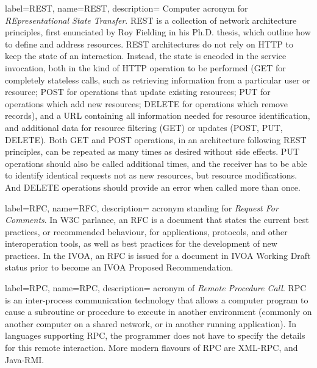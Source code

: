{
    label={REST},
    name={REST},
    description={
    	Computer acronym for \emph{REpresentational State Transfer}.
        REST is a collection of network architecture principles, first
        enunciated by Roy Fielding in his Ph.D. thesis, which outline
        how to define and address resources. REST architectures do not
        rely on \gls{HTTP} to keep the state of an interaction.
        Instead, the state is encoded in the service invocation, both
        in the kind of HTTP operation to be performed (GET for
        completely stateless calls, such as retrieving information from
        a particular user or resource; POST for operations that update
        existing resources; PUT for operations which add new resources;
        DELETE for operations which remove records), and a URL
        containing all information needed for resource identification,
        and additional data for resource filtering (GET) or updates
        (POST, PUT, DELETE). Both GET and POST operations, in an
        architecture following REST principles, can be repeated as many
        times as desired without side effects. PUT operations should
        also be called additional times, and the receiver has to be
        able to identify identical requests not as new resources, but
        resource modifications. And DELETE operations should provide an
        error when called more than once.
    }
}

{
    label={RFC},
    name={RFC},
    description={
    	acronym standing for \emph{Request For Comments}. In \gls{W3C}
        parlance, an RFC is a document that states the current best
        practices, or recommended behaviour, for applications,
        protocols, and other interoperation tools, as well as best
        practices for the development of new practices. In the
        \gls{IVOA}, an RFC is issued for a document in \gls{IVOA
        Working Draft} status prior to become an \gls{IVOA Proposed
        Recommendation}.
    }
}

{
    label={RPC},
    name={RPC},
    description={
    	acronym of \emph{Remote Procedure Call}. RPC is an
        inter-process communication technology that allows a computer
        program to cause a subroutine or procedure to execute in
        another environment (commonly on another computer on a shared
        network, or in another running application). In languages
        supporting RPC, the programmer does not have to specify the
        details for this remote interaction. More modern flavours of
        RPC are \gls{XML-RPC}, and \gls{Java-RMI}.
    }
}

